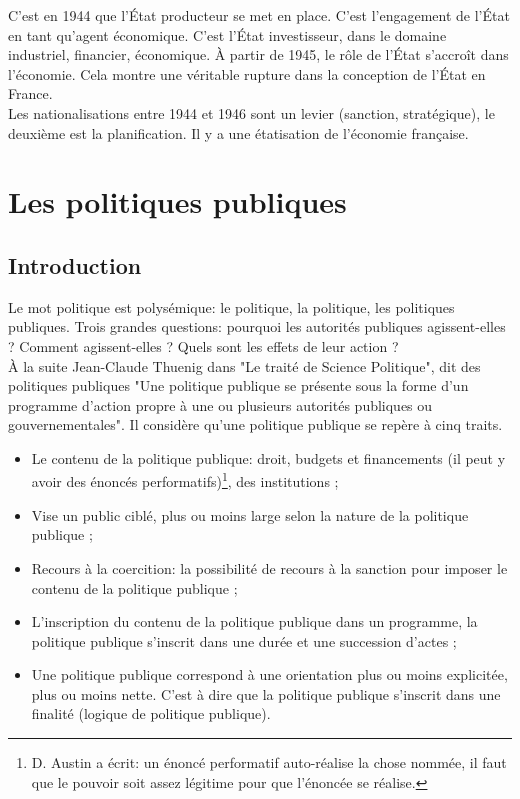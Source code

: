 \documentclass[10pt, a4paper, openany]{book}
\begin{document}
C'est en 1944 que l'État producteur se met en place. C'est l'engagement de l'État en tant qu'agent économique. C'est l'État investisseur, dans le domaine industriel, financier, économique. À partir de 1945, le rôle de l'État s'accroît dans l'économie. Cela montre une véritable rupture dans la conception de l'État en France. \\
Les nationalisations entre 1944 et 1946 sont un levier (sanction, stratégique), le deuxième est la planification. Il y a une étatisation de l'économie française. 



\part{Les politiques publiques}

\chapter{Introduction}

Le mot politique est polysémique: le politique, la politique, les politiques publiques. Trois grandes questions: pourquoi les autorités publiques agissent-elles ? Comment agissent-elles ? Quels sont les effets de leur action ? \\
À la suite Jean-Claude Thuenig dans "Le traité de Science Politique", dit des politiques publiques "Une politique publique se présente sous la forme d'un programme d'action propre à une ou plusieurs autorités publiques ou gouvernementales". Il considère qu'une politique publique se repère à cinq traits.
\begin{itemize}
\item Le contenu de la politique publique: droit, budgets et financements (il peut y avoir des énoncés performatifs)\footnote{D. Austin a écrit: un énoncé performatif auto-réalise la chose nommée, il faut que le pouvoir soit assez légitime pour que l'énoncée se réalise.}, des institutions ;
\item Vise un public ciblé, plus ou moins large selon la nature de la politique publique ; 
\item Recours à la coercition: la possibilité de recours à la sanction pour imposer le contenu de la politique publique ;
\item L'inscription du contenu de la politique publique dans un programme, la politique publique s'inscrit dans une durée et une succession d'actes ;
\item Une politique publique correspond à une orientation plus ou moins explicitée, plus ou moins nette. C'est à dire que la politique publique s'inscrit dans une finalité (logique de politique publique). 
\end{itemize}
\end{document}

